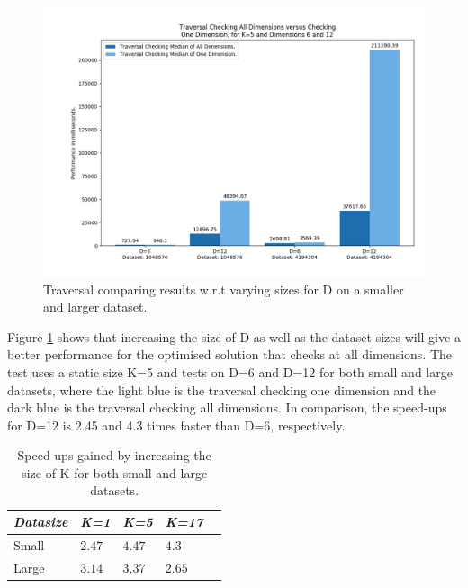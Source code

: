 \begin{figure}[H]
\centering
\includegraphics[width=1\textwidth]{pics/plot-figs/new-trav-k5-d6d12.png}
\caption{Traversal comparing results w.r.t varying sizes for D on a smaller and larger dataset.}
\label{fig:trav1}
\end{figure}

Figure \ref{fig:trav1} shows that increasing the size of D as well as the dataset sizes will give a better performance for the optimised solution that checks at all dimensions. The test uses a static size K=5 and tests on D=6 and D=12 for both small and large datasets, where the light blue is the traversal checking one dimension and the dark blue is the traversal checking all dimensions. In comparison, the speed-ups for D=12 is 2.45 and 4.3 times faster than D=6, respectively. 


\begin{table}[H]
\centering
\begin{tabular}{@{} *5l @{}}    \toprule
\emph{Datasize} & \emph{K=1} & \emph{K=5} & \emph{K=17} &  \\\midrule
Small     & $2.47$  & $4.47$  & $4.3$  &   \\ 
Large     & $3.14$ & $3.37$ & $2.65$ & \\ \bottomrule
 \hline
\end{tabular}
\caption{Speed-ups gained by increasing the size of K for both small and large datasets.}
\label{tab:travk}
\end{table}

